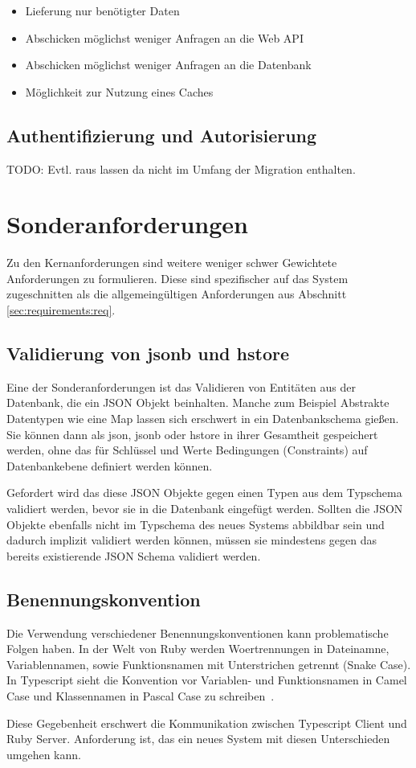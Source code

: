 \begin{itemize}
	\setlength\itemsep{-1em}
	\item Lieferung nur benötigter Daten
	\item Abschicken möglichst weniger Anfragen an die Web API
	\item Abschicken möglichst weniger Anfragen an die Datenbank
	\item Möglichkeit zur Nutzung eines Caches
\end{itemize}


\subsection{Authentifizierung und Autorisierung}
TODO: Evtl. raus lassen da nicht im Umfang der Migration enthalten.

\section{Sonderanforderungen}
Zu den Kernanforderungen sind weitere weniger schwer Gewichtete Anforderungen zu formulieren.
Diese sind spezifischer auf das System zugeschnitten als die allgemeingültigen Anforderungen aus Abschnitt \ref{sec:requirements:req}.

\subsection{Validierung von jsonb und hstore}
\label{req:validation:json}
Eine der Sonderanforderungen ist das Validieren von Entitäten aus der Datenbank, die ein JSON Objekt beinhalten.
Manche zum Beispiel Abstrakte Datentypen wie eine Map lassen sich erschwert in ein Datenbankschema gießen. Sie können dann als json,
jsonb oder hstore in ihrer Gesamtheit gespeichert werden, ohne das für Schlüssel und Werte Bedingungen (Constraints) auf Datenbankebene definiert werden können.

Gefordert wird das diese JSON Objekte gegen einen Typen aus dem Typschema validiert werden, bevor sie in die Datenbank eingefügt werden. Sollten die JSON Objekte ebenfalls nicht im Typschema des neues Systems abbildbar sein und dadurch implizit validiert werden können, müssen sie mindestens gegen das bereits existierende JSON Schema validiert werden.

\subsection{Benennungskonvention}
Die Verwendung verschiedener Benennungskonventionen kann problematische Folgen haben.
In der Welt von Ruby werden Woertrennungen in Dateinamne, Variablennamen, sowie Funktionsnamen mit Unterstrichen getrennt (Snake Case).
In Typescript sieht die Konvention vor Variablen- und Funktionsnamen in Camel Case und Klassennamen in Pascal Case zu schreiben~\cite{typescript-conventions}.

Diese Gegebenheit erschwert die Kommunikation zwischen Typescript Client und Ruby Server. Anforderung ist, das ein neues System mit diesen Unterschieden umgehen kann.

